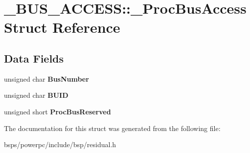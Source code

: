 \hypertarget{struct__BUS__ACCESS_1_1__ProcBusAccess}{}\section{\+\_\+\+B\+U\+S\+\_\+\+A\+C\+C\+E\+SS\+::\+\_\+\+Proc\+Bus\+Access Struct Reference}
\label{struct__BUS__ACCESS_1_1__ProcBusAccess}
\subsection*{Data Fields}
\begin{DoxyCompactItemize}
\item 
\mbox{\label{struct__BUS__ACCESS_1_1__ProcBusAccess_a2f5746377132f55f3e10dac0a7cf163f}} 
unsigned char {\bfseries Bus\+Number}
\item 
\mbox{\label{struct__BUS__ACCESS_1_1__ProcBusAccess_ad0fd4cf3baed01a31876682eb6f6d2b6}} 
unsigned char {\bfseries B\+U\+ID}
\item 
\mbox{\label{struct__BUS__ACCESS_1_1__ProcBusAccess_a72572a27b4617fef7e48d7537e5defc3}} 
unsigned short {\bfseries Proc\+Bus\+Reserved}
\end{DoxyCompactItemize}


The documentation for this struct was generated from the following file\+:\begin{DoxyCompactItemize}
\item 
bsps/powerpc/include/bsp/residual.\+h\end{DoxyCompactItemize}
